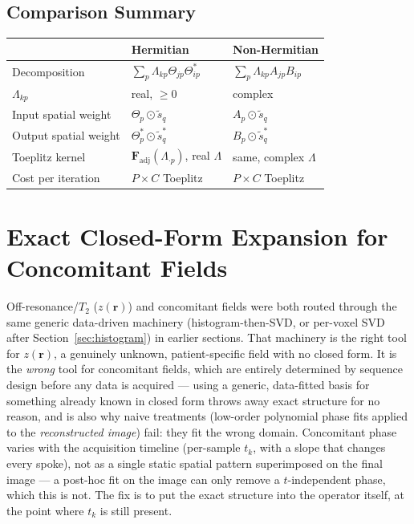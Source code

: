 \documentclass{article}
\begin{document}
\subsection{Comparison Summary}

\begin{center}
\begin{tabular}{lll}
    \hline
    & Hermitian & Non-Hermitian \\
    \hline
    Decomposition        & $\sum_p\Lambda_{kp}\Theta_{jp}\Theta^*_{ip}$ & $\sum_p\Lambda_{kp}A_{jp}B_{ip}$ \\
    $\Lambda_{kp}$       & real, $\geq 0$                               & complex \\
    Input spatial weight & $\Theta_p \odot \tilde{s}_q$                 & $A_p \odot \tilde{s}_q$ \\
    Output spatial weight& $\Theta^*_p \odot \tilde{s}^*_q$             & $B_p \odot \tilde{s}^*_q$ \\
    Toeplitz kernel      & $\mathbf{F}_\mathrm{adj}(\Lambda_{\cdot p})$, real $\Lambda$ & same, complex $\Lambda$ \\
    Cost per iteration   & $P \times C$ Toeplitz                        & $P \times C$ Toeplitz \\
    \hline
\end{tabular}
\end{center}

\section{Exact Closed-Form Expansion for Concomitant Fields}
\label{sec:concomitant_exact}

Off-resonance/$T_2$ ($z(\mathbf{r})$) and concomitant fields were both routed through the same
generic data-driven machinery (histogram-then-SVD, or per-voxel SVD after
Section~\ref{sec:histogram}) in earlier sections. That machinery is the right tool for
$z(\mathbf{r})$, a genuinely unknown, patient-specific field with no closed form. It is the
\emph{wrong} tool for concomitant fields, which are entirely determined by sequence design
before any data is acquired — using a generic, data-fitted basis for something already known in
closed form throws away exact structure for no reason, and is also why naive treatments
(low-order polynomial phase fits applied to the \emph{reconstructed image}) fail: they fit the
wrong domain. Concomitant phase varies with the acquisition timeline (per-sample $t_k$, with a
slope that changes every spoke), not as a single static spatial pattern superimposed on the final
image — a post-hoc fit on the image can only remove a $t$-independent phase, which this is not.
The fix is to put the exact structure into the operator itself, at the point where $t_k$ is still
present.
\end{document}
